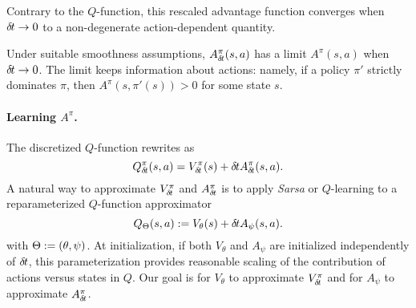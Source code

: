 Contrary to the $Q$-function,
this
rescaled advantage function converges when ${\delta\hspace{-.1em}t}\to 0$
to a non-degenerate action-dependent quantity.

\begin{theorem}
\label{thm:Alimit}
Under suitable smoothness assumptions, $A^\pi_{\delta\hspace{-.1em}t}(s,a)$ has a limit
$A^\pi(s,a)$ when ${\delta\hspace{-.1em}t}\to 0$. The limit keeps information about
actions: namely, if a policy $\pi'$ strictly dominates $\pi$, 
then
$A^\pi(s,\pi'(s))>0$ for some state $s$.
\end{theorem}




\paragraph{Learning $A^\pi$.} The discretized $Q$-function rewrites as
\begin{equation}
	Q^\pi_{\delta\hspace{-.1em}t}(s, a) = V^\pi_{\delta\hspace{-.1em}t}(s) + {\delta\hspace{-.1em}t} A^\pi_{\delta\hspace{-.1em}t}(s, a).
	\label{eq:reparam_q_pi}
\end{equation}
A natural way to approximate $V^\pi_{\delta\hspace{-.1em}t}$ and $A^\pi_{\delta\hspace{-.1em}t}$ is to apply
\emph{Sarsa} or $Q$-learning to a reparameterized $Q$-function approximator
\begin{equation}
	Q_\Theta(s, a) \mathrel{\mathop{:}}= V_{\theta}(s) + {\delta\hspace{-.1em}t} A_{\psi}(s, a).
\end{equation}
with $\Theta \mathrel{\mathop{:}}= (\theta, \psi)$. At initialization, if both $V_{\theta}$ and
$A_{\psi}$ are initialized independently of ${\delta\hspace{-.1em}t}$, this parameterization
provides reasonable scaling of the contribution of actions versus states
in $Q$.
Our goal is for $V_\theta$ to approximate $V^\pi_{\delta\hspace{-.1em}t}$ and for
$A_{\psi}$ to approximate $A^\pi_{\delta\hspace{-.1em}t}$.


